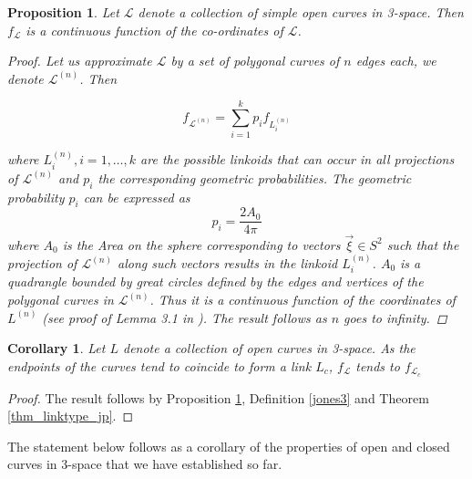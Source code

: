\documentclass{article}
\newtheorem{proposition}{Proposition}[section]
\newtheorem{corollary}{Corollary}[section]
\begin{document}


\begin{proposition}\label{cont}
Let $\mathcal{L}$ denote a collection of simple open curves in 3-space. Then $f_{\mathcal{L}}$ is a continuous function of the co-ordinates of $\mathcal{L}$.

\begin{proof}
Let us approximate $\mathcal{L}$ by a set of polygonal curves of $n$ edges each, we denote $\mathcal{L}^{(n)}$. 
Then 

\begin{equation}
f_{\mathcal{L}^{(n)}} = \sum_{i=1}^k p_i f_{L^{(n)}_i}
    \label{finte_sum_bkt}
\end{equation}

\noindent where $L^{(n)}_i, i=1, \dotsc,k$ are the possible linkoids that can occur in all projections of $\mathcal{L}^{(n)}$ and $p_i$ the corresponding geometric probabilities. 
The geometric probability $p_i$ can be expressed as 
$$p_i = \frac{2A_0}{4\pi}$$
where $A_0$ is the Area on the sphere corresponding to vectors $\vec{\xi} \in S^2$ such that the projection of $\mathcal{L}^{(n)}$ along such vectors results in the linkoid $L_i^{(n)}$. $A_0$ is a quadrangle bounded by great circles defined by the edges and vertices of the polygonal curves in $\mathcal{L}^{(n)}$. Thus it is a continuous function of the coordinates of $L^{(n)}$ (see proof of Lemma 3.1 in \cite{Panagiotou2020b}).
The result follows as $n$ goes to infinity.
\end{proof}
\end{proposition}


\begin{corollary}
Let $L$ denote a collection of open curves in 3-space. As the endpoints of the curves tend to coincide to form a link $L_c$, $f_{\mathcal{L}}$ tends to $f_{\mathcal{L}_c}$
\end{corollary}

\begin{proof}
The result follows by Proposition \ref{cont}, Definition \ref{jones3} and Theorem \ref{thm_linktype_jp}.
\end{proof}

The statement below follows as a corollary of the properties of open and closed curves in 3-space that we have established so far.
\end{document}

